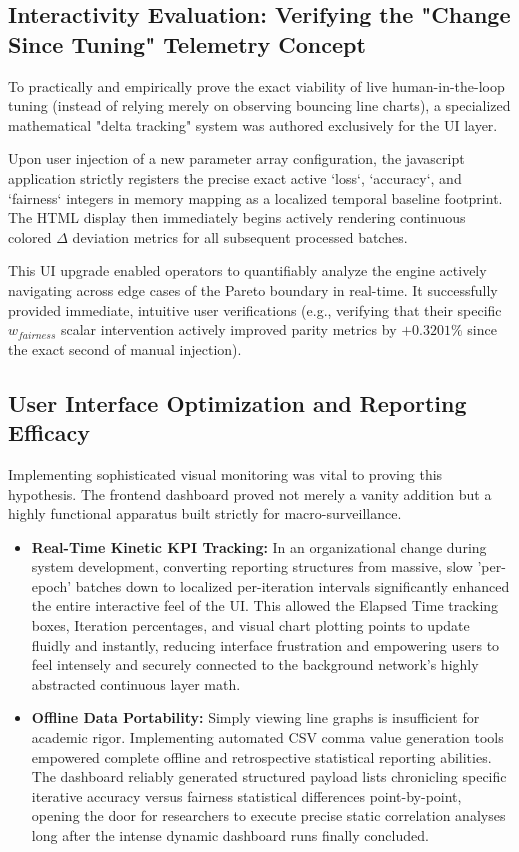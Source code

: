 \documentclass[12pt,a4paper]{article}
\begin{document}
\subsection{Interactivity Evaluation: Verifying the "Change Since Tuning" Telemetry Concept}
To practically and empirically prove the exact viability of live human-in-the-loop tuning (instead of relying merely on observing bouncing line charts), a specialized mathematical "delta tracking" system was authored exclusively for the UI layer. 

Upon user injection of a new parameter array configuration, the javascript application strictly registers the precise exact active `loss`, `accuracy`, and `fairness` integers in memory mapping as a localized temporal baseline footprint. The HTML display then immediately begins actively rendering continuous colored $\Delta$ deviation metrics for all subsequent processed batches. 

This UI upgrade enabled operators to quantifiably analyze the engine actively navigating across edge cases of the Pareto boundary in real-time. It successfully provided immediate, intuitive user verifications (e.g., verifying that their specific $w_{fairness}$ scalar intervention actively improved parity metrics by $+0.3201\%$ since the exact second of manual injection).

\subsection{User Interface Optimization and Reporting Efficacy}
Implementing sophisticated visual monitoring was vital to proving this hypothesis. The frontend dashboard proved not merely a vanity addition but a highly functional apparatus built strictly for macro-surveillance.
\begin{itemize}
    \item \textbf{Real-Time Kinetic KPI Tracking:} In an organizational change during system development, converting reporting structures from massive, slow 'per-epoch' batches down to localized per-iteration intervals significantly enhanced the entire interactive feel of the UI. This allowed the Elapsed Time tracking boxes, Iteration percentages, and visual chart plotting points to update fluidly and instantly, reducing interface frustration and empowering users to feel intensely and securely connected to the background network's highly abstracted continuous layer math.
    \item \textbf{Offline Data Portability:} Simply viewing line graphs is insufficient for academic rigor. Implementing automated CSV comma value generation tools empowered complete offline and retrospective statistical reporting abilities. The dashboard reliably generated structured payload lists chronicling specific iterative accuracy versus fairness statistical differences point-by-point, opening the door for researchers to execute precise static correlation analyses long after the intense dynamic dashboard runs finally concluded.
\end{itemize}
\end{document}
